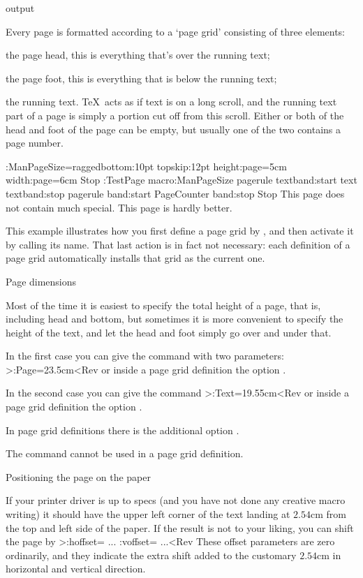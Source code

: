 %
 output

Every page is formatted according to a `page grid' consisting of
three elements:

\Enumerate \item the page head, this is everything that's over the
running text;
\item the page foot, this is everything that is below the running
text;
\item the running text. \TeX\ acts as if text is on a long scroll,
and the running text part of a page is simply a portion cut off from
this scroll.\>
Either or both of the head and foot of the page can be empty, but
usually one of the two contains a page number.

\OutExample
\OptionsMacro:ManPageSize=raggedbottom:10pt topskip:12pt
 height:page=5cm width:page=6cm Stop
\DefinePageGrid:TestPage macro:ManPageSize
 pagerule textband:start text textband:stop
 pagerule band:start PageCounter band:stop Stop
\TestPage 
This page does not contain much special.\EjectPage
This page is hardly better.
\OutExampleStop

This example illustrates how you first define a page grid by
, and then activate it by calling its name. That
last action is in fact not necessary: each definition of a page grid
automatically installs that grid as the current one.

\Section Page dimensions

Most of the time it is easiest to specify the total height of a page,
that is, including head and bottom, but sometimes it is more
convenient to specify the height of the text, and let the head and
foot simply go over and under that.

In the first case you can give the command  with
two parameters:
\Ver>\Height:Page=23.5cm<Rev or inside a page grid definition the
option .

In the second case you can give the command
\Ver>\Height:Text=19.55cm<Rev or inside a page grid definition the
option .

In page grid definitions there is the additional option
.

The  command cannot be used in a page grid definition.

\Section Positioning the page on the paper

If your printer driver is up to specs (and you have not done any
creative macro writing) it should have the upper left corner of the
text landing at $2.54$cm from the top and left side of the paper.
If the result is not to your liking, you can shift the page by
\Ver>\Distance:hoffset= ...
\Distance:voffset= ...<Rev
These offset parameters are zero ordinarily, and they indicate the
extra shift added to the customary $2.54$cm in horizontal and
vertical direction.
 
